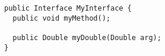 \begin{verbatim}
public Interface MyInterface {
  public void myMethod();
  
  public Double myDouble(Double arg);
}
\end{verbatim}
